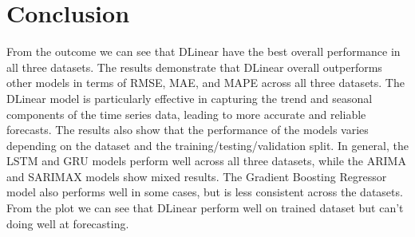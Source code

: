 \documentclass{ieeeojies}
\begin{document}
\section{Conclusion}
From the outcome we can see that DLinear have the best overall performance in all three datasets. The results demonstrate that DLinear overall outperforms other models in terms of RMSE, MAE, and MAPE across all three datasets. The DLinear model is particularly effective in capturing the trend and seasonal components of the time series data, leading to more accurate and reliable forecasts. The results also show that the performance of the models varies depending on the dataset and the training/testing/validation split. In general, the LSTM and GRU models perform well across all three datasets, while the ARIMA and SARIMAX models show mixed results. The Gradient Boosting Regressor model also performs well in some cases, but is less consistent across the datasets. From the plot we can see that DLinear perform well on trained dataset but can't doing well at forecasting.
\end{document}
